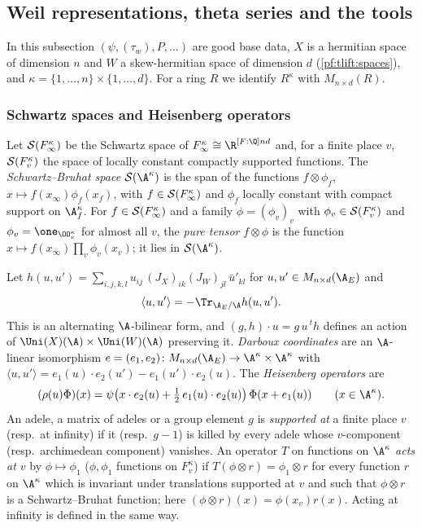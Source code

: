 \subsection{Weil representations, theta series and the tools}\label{pf:tlift:tools}

In this subsection $(\psi,(\tau_w),P,\dots)$ are good base data, $X$ is a hermitian space of dimension $n$
and $W$ a skew-hermitian space of dimension $d$ (\cref{pf:tlift:spaces}), and $\kappa=\{1,\dots,n\}\times
\{1,\dots,d\}$. For a ring $R$ we identify $R^\kappa$ with $M_{n\times d}(R)$.

\subsubsection*{Schwartz spaces and Heisenberg operators}
Let $\mathcal{S}(F_\infty^\kappa)$ be the Schwartz space of $F_\infty^\kappa\cong\R^{[F:\Q]nd}$ and, for a finite
place $v$, $\mathcal{S}(F_v^\kappa)$ the space of locally constant compactly supported functions. The
\emph{Schwartz--Bruhat space} $\tliftS(\A^\kappa)$ is the span of the functions $f\otimes\phi_f$,
$x\mapsto f(x_\infty)\phi_f(x_f)$, with $f\in\mathcal{S}(F_\infty^\kappa)$ and $\phi_f$ locally constant with compact
support on $\A_f^\kappa$. For $f\in\mathcal{S}(F_\infty^\kappa)$ and a family $\phi=(\phi_v)_v$ with
$\phi_v\in\mathcal{S}(F_v^\kappa)$ and $\phi_v=\one_{\OO_v^\kappa}$ for almost all $v$, the \emph{pure tensor}
$f\otimes\phi$ is the function $x\mapsto f(x_\infty)\prod_v\phi_v(x_v)$; it lies in $\tliftS(\A^\kappa)$.

Let $h(u,u')=\sum_{i,j,k,l}u_{ij}\,(J_X)_{ik}(J_W)_{jl}\,\bar u'_{kl}$ for $u,u'\in M_{n\times d}(\tliftAE)$ and
\[
  \langle u,u'\rangle=-\Tr_{\tliftAE/\A}h(u,u').
\]
This is an alternating $\A$-bilinear form, and $(g,h)\cdot u=g\,u\,{}^th$ defines an action of
$\Uni(X)(\A)\times\Uni(W)(\A)$ preserving it. \emph{Darboux coordinates} are an $\A$-linear isomorphism
$e=(e_1,e_2)\colon M_{n\times d}(\tliftAE)\to\A^\kappa\times\A^\kappa$ with
$\langle u,u'\rangle=e_1(u)\cdot e_2(u')-e_1(u')\cdot e_2(u)$. The \emph{Heisenberg operators} are
\begin{equation}\label{eq:tlift:schr}
  (\rho(u)\Phi)(x)=\psi\bigl(x\cdot e_2(u)+\tfrac12\,e_1(u)\cdot e_2(u)\bigr)\,\Phi(x+e_1(u))\qquad(x\in\A^\kappa).
\end{equation}
An adele, a matrix of adeles or a group element $g$ is \emph{supported at} a finite place $v$ (resp.\ at
infinity) if it (resp.\ $g-1$) is killed by every adele whose $v$-component (resp.\ archimedean
component) vanishes. An operator $T$ on functions on $\A^\kappa$ \emph{acts at $v$} by $\phi\mapsto\phi_1$
($\phi,\phi_1$ functions on $F_v^\kappa$) if $T(\phi\otimes r)=\phi_1\otimes r$ for every function $r$ on
$\A^\kappa$ which is invariant under translations supported at $v$ and such that $\phi\otimes r$ is a
Schwartz--Bruhat function; here $(\phi\otimes r)(x)=\phi(x_v)r(x)$. Acting at infinity is defined in the
same way.

